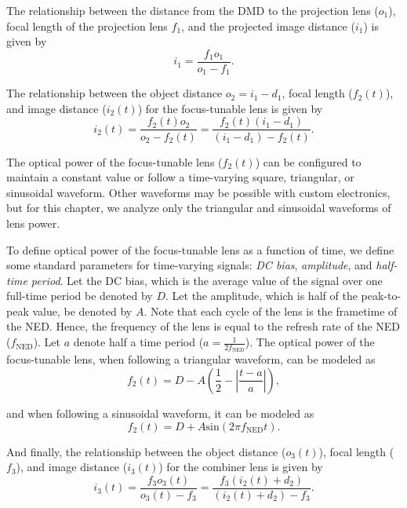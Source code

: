 The relationship between the distance from the DMD to the projection lens ($o_1$), focal length of the projection lens $f_1$, and the projected image distance ($i_1$) is given by
\begin{equation}
i_1 = \frac{f_1 o_1}{o_1 - f_1}.
\label{eq:img1}
\end{equation}

The relationship between the object distance $o_2 = i_1 - d_1$, focal length ($f_2(t)$), and image distance ($i_2(t)$) for the focus-tunable lens is given by
\begin{equation}
i_2(t) = \frac{f_2(t) o_2}{o_2 - f_2(t)} = \frac{f_2(t) (i_1 - d_1)}{(i_1 - d_1) - f_2(t)}.
\label{eq:img2}
\end{equation}

The optical power of the focus-tunable lens ($f_2(t)$) can be configured to maintain a constant value or follow a time-varying square, triangular, or sinusoidal waveform. Other waveforms may be possible with custom electronics, but for this chapter, we analyze only the triangular and sinusoidal waveforms of lens power.

To define optical power of the focus-tunable lens as a function of time, we define some standard parameters for time-varying signals: \emph{DC bias}, \emph{amplitude}, and \emph{half-time period}. Let the DC bias, which is the average value of the signal over one full-time period be denoted by $D$. Let the amplitude, which is half of the peak-to-peak value, be denoted by $A$. Note that each cycle of the lens is the frametime of the NED. Hence, the frequency of the lens is equal to the refresh rate of the NED ($f_{\text{NED}}$). Let $a$ denote half a time period ($a = \frac{1}{2f_{\text{NED}}}$). The optical power of the focus-tunable lens, when following a triangular waveform, can be modeled as
\begin{equation}
f_2(t) = D - A\left(\frac{1}{2} - \left|\frac{t - a}{a}\right|\right),
\label{eq:general_triangular}
\end{equation}

and when following a sinusoidal waveform, it can be modeled as
\begin{equation}
f_2(t) = D + A\text{sin}(2\pi f_{\text{NED}} t).
\label{eq:general_sinusoidal}
\end{equation}

And finally, the relationship between the object distance ($o_3(t)$), focal length ($f_3$), and image distance ($i_3(t)$) for the combiner lens is given by
\begin{equation}
i_3(t) = \frac{f_3 o_3(t)}{o_3(t) - f_3} = \frac{f_3(i_2(t) + d_2)}{(i_2(t) + d_2) - f_3}.
\label{eq:img3}
\end{equation}

